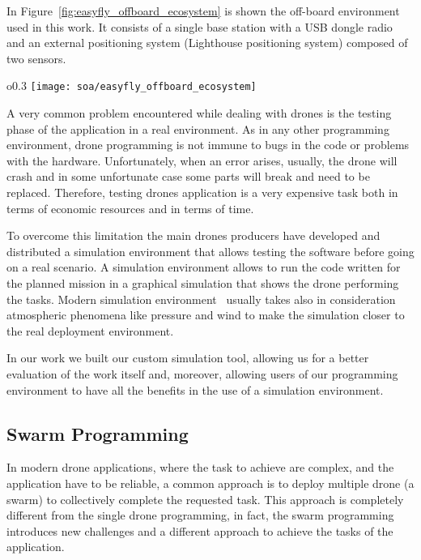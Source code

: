In Figure~\ref{fig:easyfly_offboard_ecosystem} is shown the off-board environment used in this work. 
It consists of a single base station with a USB dongle radio and an external positioning system (Lighthouse positioning system) composed of 
two sensors. 

\begin{wrapfigure}{o}{0.3\textwidth}
    \texttt{[image: soa/easyfly\_offboard\_ecosystem]}
    \caption{EasyFly off-board ecosystem}\label{fig:easyfly_offboard_ecosystem}
\end{wrapfigure}

A very common problem encountered while dealing with drones is the testing phase of the application in a real environment. 
As in any other programming environment, drone programming is not immune to bugs in the code or problems with the hardware. 
Unfortunately, when an error arises, usually, the drone will crash and in some unfortunate case some parts will break and need to be replaced. 
Therefore, testing drones application is a very expensive task both in terms of economic resources and in terms of time. 

To overcome this limitation the main drones producers have developed and distributed a simulation environment that allows 
testing the software before going on a real scenario. 
A simulation environment allows to run the code written for the planned mission in a graphical simulation that shows the drone performing the tasks. 
Modern simulation environment~\cite{sphinx, DIJflightSimulator} usually takes also in consideration atmospheric phenomena like pressure and wind to make the simulation 
closer to the real deployment environment.

In our work we built our custom simulation tool, allowing us for a better evaluation of the work itself and, moreover, allowing  
users of our programming environment to have all the benefits in the use of a simulation environment.

\subsection{Swarm Programming}\label{subsec:swarm_programming}
In modern drone applications, where the task to achieve are complex, and the application have to be reliable, a common approach is 
to deploy multiple drone (a swarm) to collectively complete the requested task. This approach is completely different from the single 
drone programming, in fact, the swarm programming introduces new challenges and a different approach to achieve the tasks of the application.

